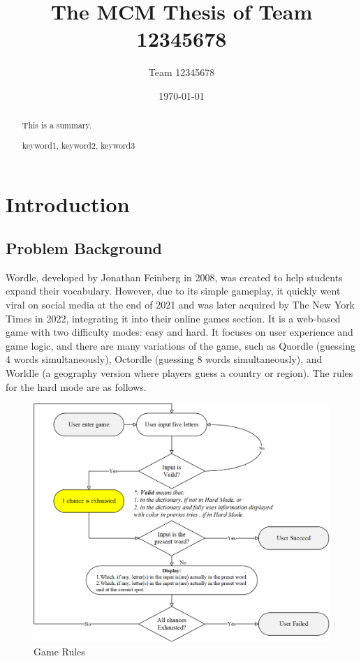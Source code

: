 \documentclass{mcmthesis}  %
\title{The MCM Thesis of Team 12345678}  %
\author{\small Team 12345678}  %
\date{\today}  %
\begin{document}
\begin{abstract}  %
This is a summary.
\begin{keywords}  %
keyword1, keyword2, keyword3
\end{keywords}  %
\end{abstract}  %
\maketitle  %

\tableofcontents  %


\newpage  %
\section{Introduction}  %

\subsection{Problem Background}

Wordle, developed by Jonathan Feinberg in 2008, was created 
to help students expand their vocabulary. However, due to its
simple gameplay, it quickly went viral on social media at the 
end of 2021 and was later acquired by The New York Times in 2022, 
integrating it into their online games section. It is a web-based 
game with two difficulty modes: easy and hard. It focuses on user 
experience and game logic, and there are many variations of the game, 
such as Quordle (guessing 4 words simultaneously), Octordle 
(guessing 8 words simultaneously), and Worldle (a geography version where 
players guess a country or region). The rules for the hard mode are as follows.

\begin{figure}[htbp]  %
\small
\centering  %
\includegraphics[width=14cm]{figure/F1.png}  %
\caption{Game Rules} \label{Figure1}  %
\end{figure}  %
\end{document}
